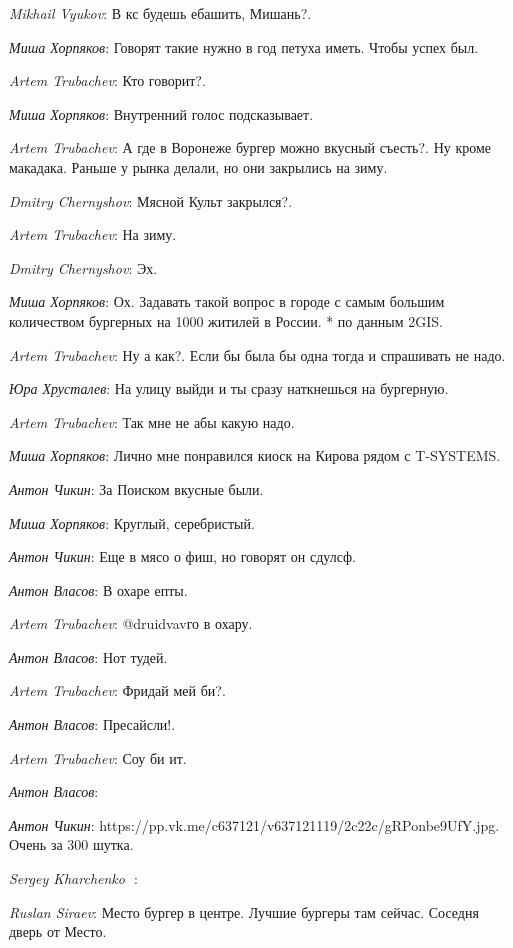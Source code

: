 \documentclass[10pt]{book}
\newcommand{\AUTHOR}[1]{\emph{#1}:}
\begin{document}
\AUTHOR{Mikhail Vyukov} В кс будешь ебашить, Мишань?.

\AUTHOR{Миша Хорпяков} Говорят такие нужно в год петуха иметь. Чтобы успех был.

\AUTHOR{Artem Trubachev} Кто говорит?.

\AUTHOR{Миша Хорпяков} Внутренний голос подсказывает.

\AUTHOR{Artem Trubachev} А где в Воронеже бургер можно вкусный съесть?. Ну кроме макадака. Раньше у рынка делали, но они закрылись на зиму.

\AUTHOR{Dmitry Chernyshov} Мясной Культ закрылся?.

\AUTHOR{Artem Trubachev} На зиму.

\AUTHOR{Dmitry Chernyshov} Эх.

\AUTHOR{Миша Хорпяков} Ох. Задавать такой вопрос в городе с самым большим количеством бургерных на 1000 житилей в России. * по данным 2GIS.

\AUTHOR{Artem Trubachev} Ну а как?. Если бы была бы одна тогда и спрашивать не надо.

\AUTHOR{Юра Хрусталев} На улицу выйди  и ты сразу наткнешься на бургерную.

\AUTHOR{Artem Trubachev} Так мне не абы какую надо.

\AUTHOR{Миша Хорпяков} Лично мне понравился киоск на Кирова рядом с T-SYSTEMS.

\AUTHOR{Антон Чикин} За Поиском вкусные были.

\AUTHOR{Миша Хорпяков} Круглый, серебристый.

\AUTHOR{Антон Чикин} Еще в мясо о фиш, но говорят он сдулсф.

\AUTHOR{Антон Власов} В охаре епты.

\AUTHOR{Artem Trubachev} @druidvavго в охару.

\AUTHOR{Антон Власов} Нот тудей.

\AUTHOR{Artem Trubachev} Фридай мей би?.

\AUTHOR{Антон Власов} Пресайсли!.

\AUTHOR{Artem Trubachev} Соу би ит.

\AUTHOR{Антон Власов}

\AUTHOR{Антон Чикин} https://pp.vk.me/c637121/v637121119/2c22c/gRPonbe9UfY.jpg. Очень за 300 шутка.

\AUTHOR{Sergey Kharchenko 🦁}

\AUTHOR{Ruslan Siraev} Место бургер в центре. Лучшие бургеры там сейчас. Соседня дверь от Место.
\end{document}
